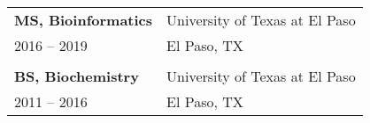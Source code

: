 %
%
%


\vspace{0.2cm} %

\begin{tabular}{p{5cm} p{\dimexpr\textwidth-5.2cm}}
  \textbf{MS, Bioinformatics} & University of Texas at El Paso \\
  2016 -- 2019 & El Paso, TX \\
  & \\[-0.2cm] %
  \textbf{BS, Biochemistry} & University of Texas at El Paso \\
  2011 -- 2016 & El Paso, TX \\
\end{tabular}

\vspace{0.5cm} %